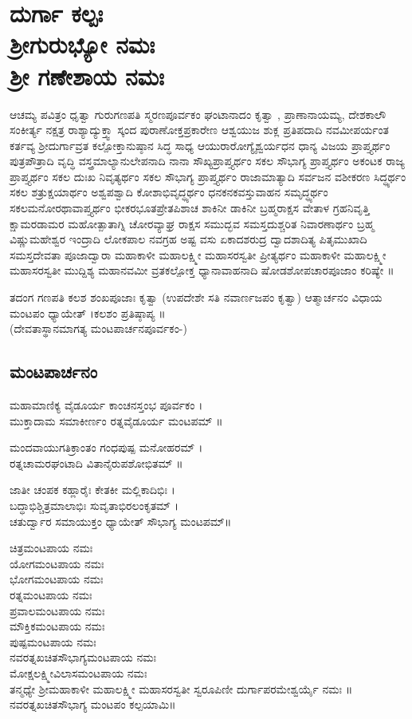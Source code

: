 \chapter*{\center ದುರ್ಗಾ ಕಲ್ಪಃ \\ \Large ಶ್ರೀಗುರುಭ್ಯೋ ನಮಃ\\
ಶ್ರೀ ಗಣೇಶಾಯ ನಮಃ}

ಆಚಮ್ಯ ಪವಿತ್ರಂ ಧೃತ್ವಾ ಗುರುಗಣಪತಿ ಸ್ಮರಣಪೂರ್ವಕಂ ಘಂಟಾನಾದಂ ಕೃತ್ವಾ , ಪ್ರಾಣಾನಾಯಮ್ಯ, ದೇಶಕಾಲೌ ಸಂಕೀರ್ತ್ಯ ನಕ್ಷತ್ರ ರಾಶ್ಯಾದ್ಯುಕ್ತ್ವಾ ಸ್ಕಂದ ಪುರಾಣೋಕ್ತಪ್ರಕಾರೇಣ  ಆಶ್ವಯುಜ ಶುಕ್ಲ ಪ್ರತಿಪದಾದಿ ನವಮೀಪರ್ಯಂತ ಕರ್ತವ್ಯ ಶ್ರೀದುರ್ಗಾವ್ರತ ಕಲ್ಪೋಕ್ತಾನುಷ್ಠಾನ ಸಿದ್ಧ ಸಾಧ್ಯ ಆಯುರಾರೋಗ್ಯೈಶ್ವರ್ಯಧನ ಧಾನ್ಯ ವಿಜಯ ಪ್ರಾಪ್ತ್ಯರ್ಥಂ ಪುತ್ರಪೌತ್ರಾದಿ ವೃದ್ಧಿ ವಸ್ತ್ರಮಾಲ್ಯಾನುಲೇಪನಾದಿ ನಾನಾ ಸೌಖ್ಯಪ್ರಾಪ್ತ್ಯರ್ಥಂ ಸಕಲ ಸೌಭಾಗ್ಯ ಪ್ರಾಪ್ತ್ಯರ್ಥಂ ಅಕಂಟಕ ರಾಜ್ಯ ಪ್ರಾಪ್ತ್ಯರ್ಥಂ ಸಕಲ ದುಃಖ ನಿವೃತ್ಯರ್ಥಂ ಸಕಲ ಸೌಭಾಗ್ಯ ಪ್ರಾಪ್ತ್ಯರ್ಥಂ ರಾಜಾಮಾತ್ಯಾದಿ ಸರ್ವಜನ ವಶೀಕರಣ ಸಿದ್ಧ್ಯರ್ಥಂ ಸಕಲ ಶತ್ರುಕ್ಷಯಾರ್ಥಂ ಅಶ್ವಪಶ್ವಾದಿ ಕೋಶಾಭಿವೃದ್ಧ್ಯರ್ಥಂ ಧನಕನಕವಸ್ತುವಾಹನ ಸಮೃದ್ಧ್ಯರ್ಥಂ ಸಕಲಮನೋರಥಾವಾಪ್ತ್ಯರ್ಥಂ ಭೀಕರಭೂತಪ್ರೇತಪಿಶಾಚ ಶಾಕಿನೀ ಡಾಕಿನೀ ಬ್ರಹ್ಮರಾಕ್ಷಸ ವೇತಾಳ ಗ್ರಹನಿವೃತ್ತಿ ಕ್ಷಾಮರಡಾಮರ ಮಹೋತ್ಪಾತಾಗ್ನಿ ಚೋರವ್ಯಾಘ್ರ ರಾಕ್ಷಸ ಸಮುದ್ಭವ ಸಮಸ್ತದುಶ್ಚರಿತ ನಿವಾರಣಾರ್ಥಂ ಬ್ರಹ್ಮ ವಿಷ್ಣುಮಹೇಶ್ವರ ಇಂದ್ರಾದಿ ಲೋಕಪಾಲ ನವಗ್ರಹ ಅಷ್ಟ ವಸು ಏಕಾದಶರುದ್ರ ದ್ವಾದಶಾದಿತ್ಯ ಪಿತೃಮುಖಾದಿ ಸಮಸ್ತದೇವತಾ ಪೂಜಾದ್ವಾರಾ ಮಹಾಕಾಳೀ ಮಹಾಲಕ್ಷ್ಮೀ ಮಹಾಸರಸ್ವತೀ ಪ್ರೀತ್ಯರ್ಥಂ ಮಹಾಕಾಳೀ ಮಹಾಲಕ್ಷ್ಮೀ ಮಹಾಸರಸ್ವತೀ ಮುದ್ದಿಶ್ಯ ಮಹಾನವಮೀ ವ್ರತಕಲ್ಪೋಕ್ತ ಧ್ಯಾನಾವಾಹನಾದಿ ಷೋಡಶೋಪಚಾರಪೂಜಾಂ ಕರಿಷ್ಯೇ ॥

ತದಂಗ ಗಣಪತಿ ಕಲಶ ಶಂಖಪೂಜಾಃ ಕೃತ್ವಾ (ಉಪದೇಶೇ ಸತಿ ನವಾರ್ಣಜಪಂ ಕೃತ್ವಾ) ಆತ್ಮಾರ್ಚನಂ ವಿಧಾಯ ಮಂಟಪಂ ಧ್ಯಾಯೇತ್ ।ಕಲಶಂ  ಪ್ರತಿಷ್ಠಾಪ್ಯ ॥\\
(ದೇವತಾಸ್ಥಾನಮಾಗತ್ಯ ಮಂಟಪಾರ್ಚನಪೂರ್ವಕಂ-)\\
\section{ಮಂಟಪಾರ್ಚನಂ}
ಮಹಾಮಾಣಿಕ್ಯ ವೈಡೂರ್ಯ ಕಾಂಚನಸ್ತಂಭ ಪೂರ್ವಕಂ ।\\
ಮುಕ್ತಾದಾಮ ಸಮಾಕೀರ್ಣಂ ರತ್ನವೈಡೂರ್ಯ ಮಂಟಪಮ್ ॥

ಮಂದವಾಯುಗತಿಕ್ರಾಂತಂ ಗಂಧಪುಷ್ಪ ಮನೋಹರಮ್ ।\\
ರತ್ನಚಾಮರಘಂಟಾದಿ ವಿತಾನೈರುಪಶೋಭಿತಮ್ ॥

ಜಾತೀ ಚಂಪಕ ಕಹ್ಲಾರೈಃ ಕೇತಕೀ ಮಲ್ಲಿಕಾದಿಭಿಃ ।\\
ಬದ್ಧಾಭಿಶ್ಚಿತ್ರಮಾಲಾಭಿಃ ಸುವೃತಾಭಿರಲಂಕೃತಮ್ ।\\
ಚತುರ್ದ್ವಾರ ಸಮಾಯುಕ್ತಂ ಧ್ಯಾಯೇತ್ ಸೌಭಾಗ್ಯ ಮಂಟಪಮ್॥

ಚಿತ್ರಮಂಟಪಾಯ ನಮಃ\\
ಯೋಗಮಂಟಪಾಯ ನಮಃ\\
ಭೋಗಮಂಟಪಾಯ ನಮಃ\\
ರತ್ನಮಂಟಪಾಯ ನಮಃ\\
ಪ್ರವಾಲಮಂಟಪಾಯ ನಮಃ\\
ಮೌಕ್ತಿಕಮಂಟಪಾಯ ನಮಃ\\
ಪುಷ್ಪಮಂಟಪಾಯ ನಮಃ\\
ನವರತ್ನಖಚಿತಸೌಭಾಗ್ಯಮಂಟಪಾಯ ನಮಃ\\
ಮೋಕ್ಷಲಕ್ಷ್ಮೀವಿಲಾಸಮಂಟಪಾಯ ನಮಃ\\
ತನ್ಮಧ್ಯೇ ಶ್ರೀಮಹಾಕಾಳೀ ಮಹಾಲಕ್ಷ್ಮೀ ಮಹಾಸರಸ್ವತೀ ಸ್ವರೂಪಿಣೀ ದುರ್ಗಾಪರಮೇಶ್ವರ್ಯೈ ನಮಃ ॥\\
ನವರತ್ನಖಚಿತಸೌಭಾಗ್ಯ ಮಂಟಪಂ ಕಲ್ಪಯಾಮಿ॥
